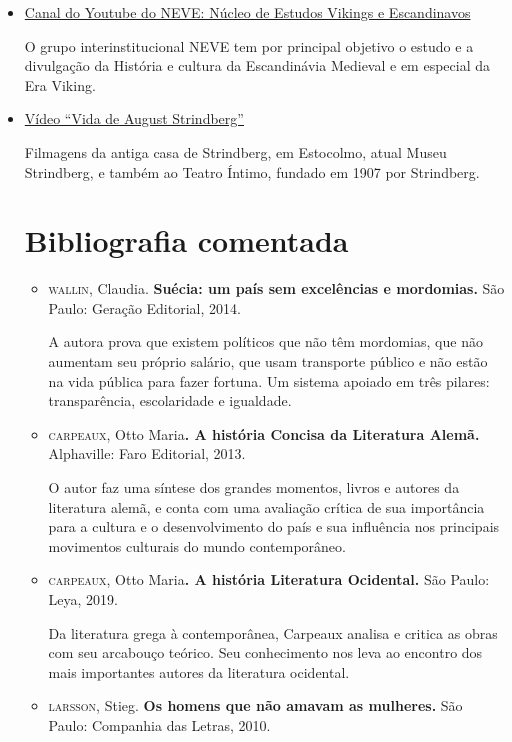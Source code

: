 \documentclass[12pt]{extarticle}
\begin{document}
\begin{itemize}
\item \href{https://www.youtube.com/channel/UCyi7TQJOK1kyIU6e4pRJrUQ}{Canal do Youtube do NEVE: Núcleo de Estudos Vikings e Escandinavos}

O grupo interinstitucional NEVE tem por principal objetivo o estudo e a divulgação da História e cultura da Escandinávia Medieval e em especial da Era Viking.

\item \href{https://www.youtube.com/watch?v=dxv7rPx8A5Q}{Vídeo ``Vida de August Strindberg''}

Filmagens da antiga casa de Strindberg, em Estocolmo, atual Museu Strindberg, e também ao Teatro Íntimo, fundado em 1907 por Strindberg.

\section{Bibliografia comentada}

\begin{itemize}
\item\textsc{wallin}, Claudia. \textbf{Suécia: um país sem excelências e mordomias.}
São Paulo: Geração Editorial, 2014.

A autora prova que existem políticos que não têm mordomias, que não
aumentam seu próprio salário, que usam transporte público e não estão na
vida pública para fazer fortuna. Um sistema apoiado em três pilares:
transparência, escolaridade e igualdade.

\item\textsc{carpeaux}, Otto Maria\textbf{. A história Concisa da Literatura Alemã.}
Alphaville: Faro Editorial, 2013.

O autor faz uma síntese dos grandes momentos, livros e autores da
literatura alemã, e conta com uma avaliação crítica de sua importância
para a cultura e o desenvolvimento do país e sua influência nos
principais movimentos culturais do mundo contemporâneo.

\item\textsc{carpeaux}, Otto Maria\textbf{. A história Literatura Ocidental.} São
Paulo: Leya, 2019.

Da literatura grega à contemporânea, Carpeaux analisa e critica as obras
com seu arcabouço teórico. Seu conhecimento nos leva ao encontro dos
mais importantes autores da literatura ocidental.

\item\textsc{larsson}, Stieg. \textbf{Os homens que não amavam as mulheres.} São
Paulo: Companhia das Letras, 2010.


\end{itemize}
\end{itemize}
\end{document}
